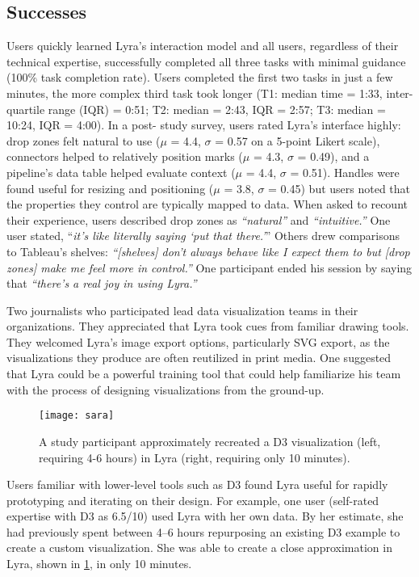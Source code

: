 \subsection{Successes}

Users quickly learned Lyra's interaction model and all users, regardless of
their technical expertise, successfully completed all three tasks with minimal
guidance (100\% task completion rate). Users completed the first two tasks in
just a few minutes, the more complex third task took longer (T1: median time =
1:33, inter-quartile range (IQR) = 0:51; T2: median = 2:43, IQR = 2:57; T3:
median = 10:24, IQR = 4:00). In a post- study survey, users rated Lyra's
interface highly: drop zones felt natural to use ($\mu$ = 4.4, $\sigma$ = 0.57
on a 5-point Likert scale), connectors helped to relatively position marks
($\mu$ = 4.3, $\sigma$ = 0.49), and a pipeline's data table helped evaluate
context ($\mu$ = 4.4, $\sigma$ = 0.51). Handles were found useful for resizing
and positioning ($\mu$ = 3.8, $\sigma$ = 0.45) but users noted that the
properties they control are typically mapped to data. When asked to recount
their experience, users described drop zones as \emph{``natural''} and
\emph{``intuitive.''} One user stated, ``\emph{it's like \emph{literally} saying
`put that there.'}'' Others drew comparisons to Tableau's shelves:
\emph{``[shelves] don't always behave like I expect them to but [drop zones]
make me feel more in control.''} One participant ended his session by saying
that \emph{``there's a real joy in using Lyra.''}

Two journalists who participated lead data visualization teams in their
organizations. They appreciated that Lyra took cues from familiar drawing tools.
They welcomed Lyra's image export options, particularly SVG export, as the
visualizations they produce are often reutilized in print media. One suggested
that Lyra could be a powerful training tool that could help familiarize his team
with the process of designing visualizations from the ground-up.

\begin{figure}[b!]
\centering
  \texttt{[image: sara]}
  \caption{A study participant approximately recreated a D3 visualization (left,
  requiring 4-6 hours) in Lyra (right, requiring only 10 minutes).}
  \label{fig:lyra:sara_waitlists}
\end{figure}

Users familiar with lower-level tools such as D3 found Lyra useful for rapidly
prototyping and iterating on their design. For example, one user (self-rated
expertise with D3 as 6.5/10) used Lyra with her own data. By her estimate, she
had previously spent between 4--6 hours repurposing an existing D3 example to
create a custom visualization. She was able to create a close approximation in
Lyra, shown in \cref{fig:lyra:sara_waitlists}, in only 10 minutes.

